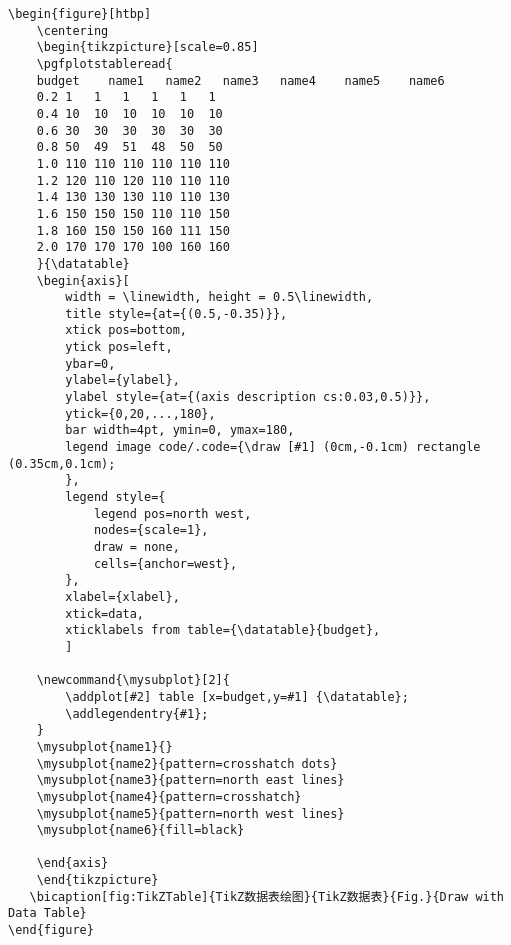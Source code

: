 {\wuhao
\begin{lstlisting}
\begin{figure}[htbp]
    \centering
	\begin{tikzpicture}[scale=0.85]
	\pgfplotstableread{
	budget    name1   name2   name3   name4    name5    name6
	0.2 1   1   1   1   1   1
	0.4 10  10  10  10  10  10
	0.6 30  30  30  30  30  30 
	0.8 50  49  51  48  50  50
	1.0 110 110 110 110 110 110
	1.2 120 110 120 110 110 110
	1.4 130 130 130 110 110 130
	1.6 150 150 150 110 110 150
	1.8 160 150 150 160 111 150
	2.0 170 170 170 100 160 160
	}{\datatable}
	\begin{axis}[
	    width = \linewidth, height = 0.5\linewidth,
	    title style={at={(0.5,-0.35)}},
	    xtick pos=bottom,
	    ytick pos=left,
	    ybar=0,
	    ylabel={ylabel},
	    ylabel style={at={(axis description cs:0.03,0.5)}},
	    ytick={0,20,...,180},
	    bar width=4pt, ymin=0, ymax=180,
	    legend image code/.code={\draw [#1] (0cm,-0.1cm) rectangle (0.35cm,0.1cm);
	    },
	    legend style={
	        legend pos=north west,
	        nodes={scale=1},
	        draw = none,
	        cells={anchor=west}, 
	    },
	    xlabel={xlabel},
	    xtick=data,
	    xticklabels from table={\datatable}{budget},
	    ]
	
	\newcommand{\mysubplot}[2]{
	    \addplot[#2] table [x=budget,y=#1] {\datatable};
	    \addlegendentry{#1};
	}
	\mysubplot{name1}{}
	\mysubplot{name2}{pattern=crosshatch dots}
	\mysubplot{name3}{pattern=north east lines}
	\mysubplot{name4}{pattern=crosshatch}
	\mysubplot{name5}{pattern=north west lines}
	\mysubplot{name6}{fill=black}
	
	\end{axis}
	\end{tikzpicture}
   \bicaption[fig:TikZTable]{TikZ数据表绘图}{TikZ数据表}{Fig.}{Draw with Data Table}
\end{figure}
\end{lstlisting}
}

